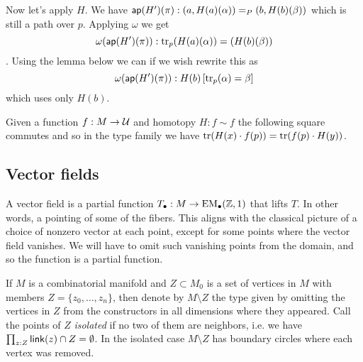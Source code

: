 Now let's apply \( H \). We have \( \mathsf{ap}(H')(\pi):(a,H(a)(\alpha))=_P(b,H(b)(\beta)) \) which is still a path over \( p \). Applying \( \omega \) we get \[ \omega(\mathsf{ap}(H')(\pi)):\mathrm{tr}_p(H(a)(\alpha))=(H(b)(\beta)) \]. Using the lemma below we can if we wish rewrite this as 
\[ 
\omega(\mathsf{ap}(H')(\pi)):H(b)\left[\mathrm{tr}_p(\alpha)=\beta\right]
\]
which uses only \( H(b) \).

\begin{mylemma}
Given a function \( f:M\to\mathcal{U} \) and homotopy \( H:f\sim f \) the following square commutes and so in the type family we have \( \mathrm{tr}(H(x)\cdot f(p)) = \mathrm{tr}(f(p)\cdot H(y)) \).
\end{mylemma}
\begin{center}
\end{center}

\subsection{Vector fields}

A vector field is a partial function \( T_\bullet:M\to\mathrm{EM_{\bullet}}(\mathbb{Z},1) \) that lifts \( T \). In other words, a pointing of some of the fibers. This aligns with the classical picture of a choice of nonzero vector at each point, except for some points where the vector field vanishes. We will have to omit such vanishing points from the domain, and so the function is a partial function.

\begin{mydef}
If \( M \) is a combinatorial manifold and \( Z\subset M_0 \) is a set of vertices in \( M \) with members \( Z=\{z_0,\ldots,z_n\} \), then denote by \( M\setminus Z \) the type given by omitting the vertices in \( Z \) from the constructors in all dimensions where they appeared. Call the points of \( Z \) \emph{isolated} if no two of them are neighbors, i.e. we have \( \prod_{z:Z}\mathsf{link}(z)\cap Z=\emptyset \). In the isolated case \( M\setminus Z \) has boundary circles where each vertex was removed.
\end{mydef}

